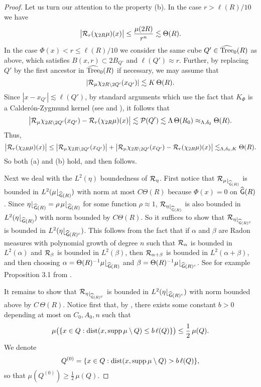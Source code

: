 \begin{proof}
Let us turn our attention to the property (b).
In the case $r>\ell(R)/10$ we have
$$\big|{\mathcal R}_r(\chi_{2R}\mu)(x)\big|\leq \frac{\mu(2R)}{r^n}\lesssim \Theta(R).$$
In the case $\Phi(x)<r\leq \ell(R)/10$ we consider the same cube $Q'\in{\widehat{{\rm Tree}}}_0(R)$ as above, 
which satisfies $B(x,r)\subset  2B_{Q'}$ and $\ell(Q')\approx r$. Further, by replacing
$Q'$ by the first ancestor in ${\widehat{{\rm Tree}}}_0(R)$ if necessary, we may assume that
$$|{\mathcal R}_\mu\chi_{2R\setminus 2Q'}(x_{Q'})|\lesssim K\,\Theta(R).$$
Since $|x-x_{Q'}|\lesssim\ell(Q')$, by standard arguments which use the fact that $K_\Phi$ is a Calder\'on-Zygmund kernel (see 
and ),
it follows that
$$\big|{\mathcal R}_\mu\chi_{2R\setminus 2Q'}(x_{Q'}) - {\mathcal R}_r(\chi_{2R}\mu)(x)\big|\lesssim {\mathcal P}(Q')\lesssim
\Lambda\,\Theta(R_0)\approx_{\Lambda,\delta_0}\Theta(R).$$
Thus,
$$\big|{\mathcal R}_r(\chi_{2R}\mu)(x)\big|\leq 
\big|{\mathcal R}_\mu\chi_{2R\setminus 2Q'}(x_{Q'})\big| + 
\big|{\mathcal R}_\mu\chi_{2R\setminus 2Q'}(x_{Q'}) - {\mathcal R}_r(\chi_{2R}\mu)(x)\big|\lesssim_{\Lambda,\delta_0,K}\Theta(R).$$
So both (a) and (b) hold, and then  follows.
\vv

Next we deal with the $L^2(\eta)$ boundedness of ${\mathcal R}_\eta$. 
First notice that  ${\mathcal R}_{\mu{\lfloor}_{{\widehat{{\mathsf{G}}}}(R)}}$ is bounded in $L^2(\mu{\lfloor}_{{\widehat{{\mathsf{G}}}}(R)})$ with norm
at most $C\Theta(R)$ because $\Phi(x)=0$ on ${\widehat{{\mathsf{G}}}}(R)$. Since $\eta{\lfloor}_{{\widehat{{\mathsf{G}}}}(R)} = \rho\,\mu{\lfloor}_{{\widehat{{\mathsf{G}}}}(R)}$ for some function $\rho\approx1$, ${\mathcal R}_{\eta{\lfloor}_{{\widehat{{\mathsf{G}}}}(R)}}$ is also bounded in $L^2(\eta{\lfloor}_{{\widehat{{\mathsf{G}}}}(R)})$ with norm bounded by $C\Theta(R)$.
So it suffices to show that ${\mathcal R}_{\eta{\lfloor}_{{\widehat{{\mathsf{G}}}}(R)^c}}$ is bounded in $L^2(\eta{\lfloor}_{{\widehat{{\mathsf{G}}}}(R)^c})$.
This follows from the fact that if $\alpha$ and $\beta$ are Radon measures with polynomial growth of degree $n$ such that ${\mathcal R}_\alpha$ is bounded in $L^2(\alpha)$ and 
${\mathcal R}_\beta$ is bounded in $L^2(\beta)$, then ${\mathcal R}_{\alpha+\beta}$ is bounded in $L^2(\alpha+\beta)$,
and then choosing $\alpha= \Theta(R)^{-1}\mu{\lfloor}_{{\widehat{{\mathsf{G}}}}(R)}$ and $\beta= \Theta(R)^{-1}\mu{\lfloor}_{{\widehat{{\mathsf{G}}}}(R)^c}$.
See for example Proposition 3.1 from \cite{NToV2}.
 
It remains to show that ${\mathcal R}_{\eta{\lfloor}_{{\widehat{{\mathsf{G}}}}(R)^c}}$ is bounded in $L^2(\eta{\lfloor}_{{\widehat{{\mathsf{G}}}}(R)^c})$
with norm bounded above by $C\,\Theta(R)$.
Notice first that, by , there exists some constant $b>0$ depending at most on 
$C_0,A_0,n$ such that
$$\mu\bigl(\{x\in Q:{\rm dist}(x,\operatorname{supp}\mu\setminus Q)\leq b\,\ell(Q)\}\bigr) \leq\frac12\,\mu(Q).$$
We denote
\begin{equation}\label{eqsepbb*}
Q^{(0)}= \{x\in Q:{\rm dist}(x,\operatorname{supp}\mu\setminus Q)> b\,\ell(Q)\},
\end{equation}
so that $\mu(Q^{(0)})\geq \frac12\,\mu(Q)$.


\end{proof}

